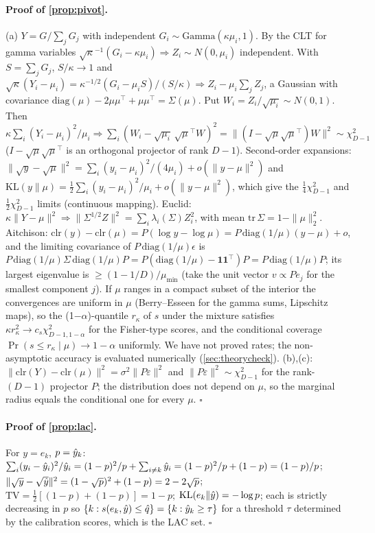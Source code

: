 \paragraph{Proof of \cref{prop:pivot}.}
(a) $Y=G/\sum_jG_j$ with independent $G_i\sim\mathrm{Gamma}(\kappa\mu_i,1)$. By the CLT for gamma variables $\sqrt\kappa^{-1}(G_i-\kappa\mu_i)\Rightarrow Z_i\sim N(0,\mu_i)$ independent. With $S=\sum_jG_j$, $S/\kappa\to1$ and $\sqrt\kappa(Y_i-\mu_i)=\kappa^{-1/2}(G_i-\mu_iS)/(S/\kappa)\Rightarrow Z_i-\mu_i\sum_jZ_j$, a Gaussian with covariance $\mathrm{diag}(\mu)-2\mu\mu^\top+\mu\mu^\top=\Sigma(\mu)$. Put $W_i=Z_i/\sqrt{\mu_i}\sim N(0,1)$. Then $\kappa\sum_i(Y_i-\mu_i)^2/\mu_i\Rightarrow\sum_i(W_i-\sqrt{\mu_i}\,\sqrt\mu^\top W)^2=\|(I-\sqrt\mu\sqrt\mu^\top)W\|^2\sim\chi^2_{D-1}$ ($I-\sqrt\mu\sqrt\mu^\top$ is an orthogonal projector of rank $D-1$). Second-order expansions: $\|\sqrt y-\sqrt\mu\|^2=\sum_i(y_i-\mu_i)^2/(4\mu_i)+o(\|y-\mu\|^2)$ and $\mathrm{KL}(y\|\mu)=\tfrac12\sum_i(y_i-\mu_i)^2/\mu_i+o(\|y-\mu\|^2)$, which give the $\tfrac14\chi^2_{D-1}$ and $\tfrac12\chi^2_{D-1}$ limits (continuous mapping). Euclid: $\kappa\|Y-\mu\|^2\Rightarrow\|\Sigma^{1/2}Z\|^2=\sum_i\lambda_i(\Sigma)Z_i^2$, with mean $\mathrm{tr}\,\Sigma=1-\|\mu\|_2^2$. Aitchison: $\mathrm{clr}(y)-\mathrm{clr}(\mu)=P(\log y-\log\mu)=P\,\mathrm{diag}(1/\mu)(y-\mu)+o$, and the limiting covariance of $P\,\mathrm{diag}(1/\mu)\epsilon$ is $P\,\mathrm{diag}(1/\mu)\Sigma\,\mathrm{diag}(1/\mu)P=P(\mathrm{diag}(1/\mu)-\mathbf 1\mathbf 1^\top)P=P\,\mathrm{diag}(1/\mu)P$; its largest eigenvalue is $\ge(1-1/D)/\mu_{\min}$ (take the unit vector $v\propto Pe_j$ for the smallest component $j$). If $\mu$ ranges in a compact subset of the interior the convergences are uniform in $\mu$ (Berry--Esseen for the gamma sums, Lipschitz maps), so the (1$-\alpha$)-quantile $r_\kappa$ of $s$ under the mixture satisfies $\kappa r_\kappa^2\to c_s\chi^2_{D-1,1-\alpha}$ for the Fisher-type scores, and the conditional coverage $\Pr(s\le r_\kappa\mid\mu)\to1-\alpha$ uniformly. We have not proved rates; the non-asymptotic accuracy is evaluated numerically (\cref{sec:theorycheck}). (b),(c): $\|\mathrm{clr}(Y)-\mathrm{clr}(\mu)\|^2=\sigma^2\|P\varepsilon\|^2$ and $\|P\varepsilon\|^2\sim\chi^2_{D-1}$ for the rank-$(D{-}1)$ projector $P$; the distribution does not depend on $\mu$, so the marginal radius equals the conditional one for every $\mu$. $\square$

\paragraph{Proof of \cref{prop:lac}.} For $y=e_k$, $p=\hat y_k$: $\sum_i(y_i-\hat y_i)^2/\hat y_i=(1-p)^2/p+\sum_{i\ne k}\hat y_i=(1-p)^2/p+(1-p)=(1-p)/p$; $\|\sqrt y-\sqrt{\hat y}\|^2=(1-\sqrt p)^2+(1-p)=2-2\sqrt p$; $\mathrm{TV}=\tfrac12[(1-p)+(1-p)]=1-p$; $\mathrm{KL}(e_k\|\hat y)=-\log p$; each is strictly decreasing in $p$ so $\{k:s(e_k,\hat y)\le\hat q\}=\{k:\hat y_k\ge\tau\}$ for a threshold $\tau$ determined by the calibration scores, which is the LAC set. $\square$

